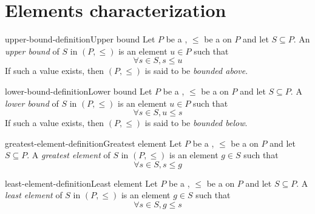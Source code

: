 \documentclass[preview]{standalone}
\begin{document}
\section{Elements characterization}

\begin{snippetdefinition}{upper-bound-definition}{Upper bound}
    Let \(P\) be a \set, \(\leq\) be a \preorder on \(P\) and let \(S\subseteq P\).
    An \textit{upper bound} of \(S\) in \((P, \leq)\) is an element \(u\in P\) such that
    \[ \forall s\in S, s \leq u \]
    If such a value exists, then \((P, \leq)\) is said to be \textit{bounded above}.
\end{snippetdefinition}

\begin{snippetdefinition}{lower-bound-definition}{Lower bound}
    Let \(P\) be a \set, \(\leq\) be a \preorder on \(P\) and let \(S\subseteq P\).
    A \textit{lower bound} of \(S\) in \((P, \leq)\) is an element \(u\in P\) such that
    \[ \forall s\in S, u \leq s \]
    If such a value exists, then \((P, \leq)\) is said to be \textit{bounded below}.
\end{snippetdefinition}


\begin{snippetdefinition}{greatest-element-definition}{Greatest element}
    Let \(P\) be a \set, \(\leq\) be a \preorder on \(P\) and let \(S\subseteq P\).
    A \textit{greatest element} of \(S\) in \((P, \leq)\) is an element \(g \in S\) such that
    \[ \forall s\in S, s \leq g \]
\end{snippetdefinition}

\begin{snippetdefinition}{least-element-definition}{Least element}
    Let \(P\) be a \set, \(\leq\) be a \preorder on \(P\) and let \(S\subseteq P\).
    A \textit{least element} of \(S\) in \((P, \leq)\) is an element \(g \in S\) such that
    \[ \forall s\in S, g \leq s \]
\end{snippetdefinition}


%
%
%
\end{document}
